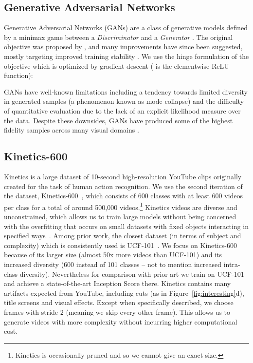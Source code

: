 \documentclass{article} \usepackage{iclr2020_conference,times}
\begin{document}
\subsection{Generative Adversarial Networks}

Generative Adversarial Networks (GANs) \citep{goodfellow2014generative} are a class of generative models defined by a minimax game between a \textit{Discriminator}  and a \textit{Generator} . The original objective was proposed by \citet{goodfellow2014generative}, and many improvements have since been suggested, mostly targeting improved training stability \citep{arjovsky2017wasserstein,zhang2018self,brock2018large,gulrajani2017improved,miyato2018spectral}. We use the hinge formulation of the objective \citep{lim2017geometric, brock2018large} which is optimized by gradient descent ( is the elementwise ReLU function):



GANs have well-known limitations including a tendency towards limited diversity in generated samples (a phenomenon known as mode collapse) and the difficulty of quantitative evaluation due to the lack of an explicit likelihood measure over the data.
Despite these downsides, GANs have produced some of the highest fidelity samples across many visual domains \citep{karras2018style,brock2018large}.

\subsection{Kinetics-600}

Kinetics is a large dataset of 10-second high-resolution YouTube clips \citep{kay2017kinetics,Kinetics} originally created for the task of human action recognition. We use the second iteration of the dataset, Kinetics-600~\citep{carreira2018short}, which consists of 600 classes with at least 600 videos per class for a total of around 500,000 videos.\footnote{Kinetics is occasionally pruned and so we cannot give an exact size.}
Kinetics videos are diverse and unconstrained, which allows us to train large models without being concerned with the overfitting that occurs on small datasets with fixed objects interacting in specified ways~\citep{ebert2017self,blank2005actions}. 
Among prior work, the closest dataset (in terms of subject and complexity) which is consistently used is UCF-101~\citep{soomro2012ucf101}.
We focus on Kinetics-600 because of its larger size (almost 50x more videos than UCF-101) and its increased diversity (600 instead of 101 classes -- not to mention increased intra-class diversity). Nevertheless for comparison with prior art we train on UCF-101 and achieve a state-of-the-art Inception Score there. Kinetics contains many artifacts expected from YouTube, including cuts (as in Figure~\ref{fig:interesting}d), title screens and visual effects. Except when specifically described, we choose frames with stride 2 (meaning we skip every other frame). This allows us to generate videos with more complexity without incurring higher computational cost.
\end{document}
